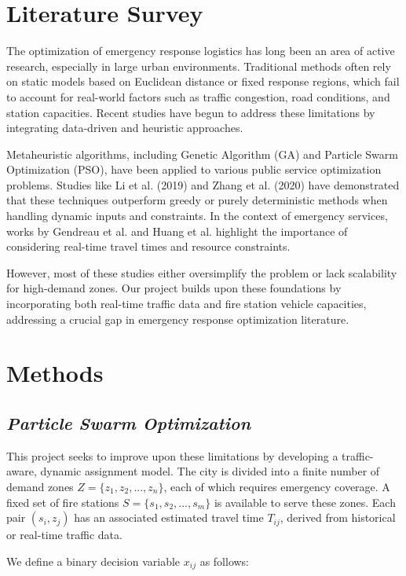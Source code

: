 \documentclass[conference]{IEEEtran}
\begin{document}
\section*{\textbf{Literature Survey}}

The optimization of emergency response logistics has long been an area of active research, especially in large urban environments. Traditional methods often rely on static models based on Euclidean distance or fixed response regions, which fail to account for real-world factors such as traffic congestion, road conditions, and station capacities. Recent studies have begun to address these limitations by integrating data-driven and heuristic approaches.

Metaheuristic algorithms, including Genetic Algorithm (GA) and Particle Swarm Optimization (PSO), have been applied to various public service optimization problems. Studies like Li et al. (2019) and Zhang et al. (2020) have demonstrated that these techniques outperform greedy or purely deterministic methods when handling dynamic inputs and constraints. In the context of emergency services, works by Gendreau et al. and Huang et al. highlight the importance of considering real-time travel times and resource constraints.

However, most of these studies either oversimplify the problem or lack scalability for high-demand zones. Our project builds upon these foundations by incorporating both real-time traffic data and fire station vehicle capacities, addressing a crucial gap in emergency response optimization literature.
\section*{\textbf{Methods}}
\subsection{\textit{ Particle Swarm Optimization }}
This project seeks to improve upon these limitations by developing a traffic-aware, dynamic assignment model. The city is divided into a finite number of demand zones $Z = \{z_1, z_2, ..., z_n\}$, each of which requires emergency coverage. A fixed set of fire stations $S = \{s_1, s_2, ..., s_m\}$ is available to serve these zones. Each pair $(s_i, z_j)$ has an associated estimated travel time $T_{ij}$, derived from historical or real-time traffic data.

We define a binary decision variable $x_{ij}$ as follows:
\end{document}
